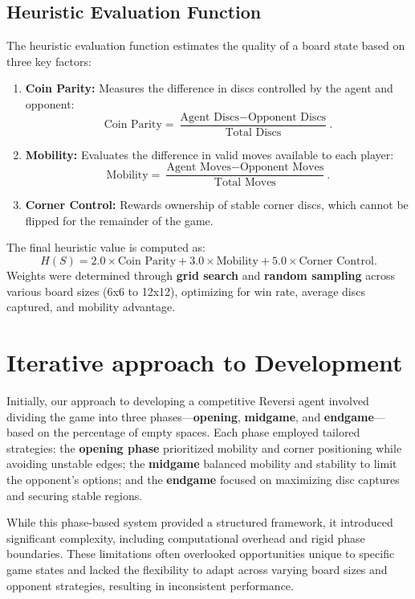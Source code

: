 \documentclass[11pt]{article}
\begin{document}
\subsection*{Heuristic Evaluation Function}
The heuristic evaluation function estimates the quality of a board state based on three key factors:
\begin{enumerate}
    \item \textbf{Coin Parity:} Measures the difference in discs controlled by the agent and opponent:
    \[
    \text{Coin Parity} = \frac{\text{Agent Discs} - \text{Opponent Discs}}{\text{Total Discs}}.
    \]
    \item \textbf{Mobility:} Evaluates the difference in valid moves available to each player:
    \[
    \text{Mobility} = \frac{\text{Agent Moves} - \text{Opponent Moves}}{\text{Total Moves}}.
    \]
    \item \textbf{Corner Control:} Rewards ownership of stable corner discs, which cannot be flipped for the remainder of the game.
\end{enumerate}

\noindent The final heuristic value is computed as:
\[
H(S) = 2.0 \times \text{Coin Parity} + 3.0 \times \text{Mobility} + 5.0 \times \text{Corner Control}.
\]
Weights were determined through \textbf{grid search} and \textbf{random sampling} across various board sizes (6x6 to 12x12), optimizing for win rate, average discs captured, and mobility advantage.


\section*{ Iterative approach to Development}
Initially, our approach to developing a competitive Reversi agent involved dividing the game into three phases—\textbf{opening}, \textbf{midgame}, and \textbf{endgame}—based on the percentage of empty spaces. Each phase employed tailored strategies: the \textbf{opening phase} prioritized mobility and corner positioning while avoiding unstable edges; the \textbf{midgame} balanced mobility and stability to limit the opponent’s options; and the \textbf{endgame} focused on maximizing disc captures and securing stable regions.

\noindent While this phase-based system provided a structured framework, it introduced significant complexity, including computational overhead and rigid phase boundaries. These limitations often overlooked opportunities unique to specific game states and lacked the flexibility to adapt across varying board sizes and opponent strategies, resulting in inconsistent performance.
\end{document}
